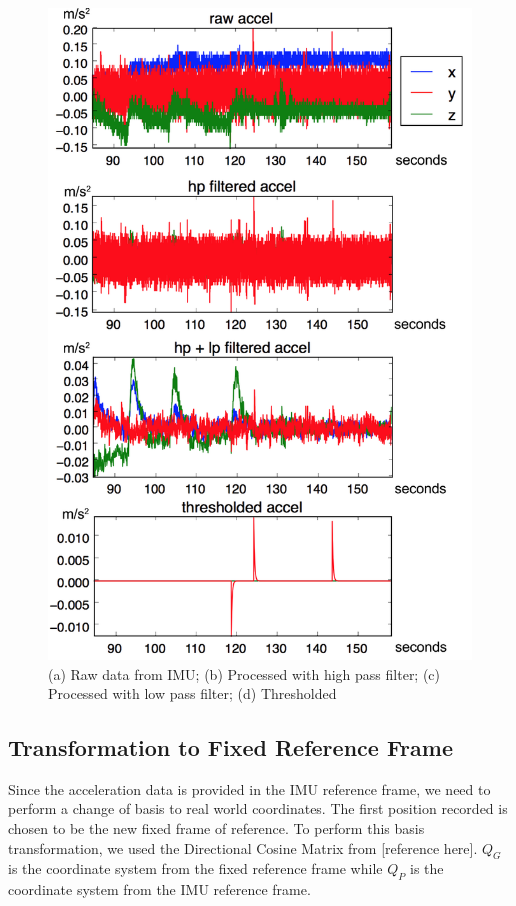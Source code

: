 \documentclass[10pt,journal]{IEEEtran}
\begin{document}
\begin{figure}[h]
    \includegraphics[width=\linewidth]{figures/filtering}
  \caption{(a) Raw data from IMU; (b) Processed with high pass filter; (c) Processed with low pass filter; (d) Thresholded}
  \label{fig:filtering}
\end{figure}

\subsection{Transformation to Fixed Reference Frame}
  Since the acceleration data is provided in the IMU reference frame, we need to perform a change of basis to real world coordinates. The first position recorded is chosen to be the new fixed frame of reference. To perform this basis transformation, we used the Directional Cosine Matrix from [reference here]. $Q_G$ is the coordinate system from the fixed reference frame while $Q_P$ is the coordinate system from the IMU reference frame.
\end{document}
